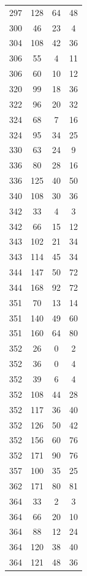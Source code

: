 \documentclass[12pt]{amsproc} %
\theoremstyle{definition}\newtheorem{defn}[thm]{Definition}
\theoremstyle{definition}\newtheorem{rem}[thm]{Remark}
\theoremstyle{definition}\newtheorem{ex}[thm]{Example}
\begin{document}
\begin{table}[ht]
    \centering
    \begin{minipage}{0.25\textwidth}
        \centering
        \begin{tabular}{c|c|c|c}
		297 & 128 & 64 & 48 \\ 
		300 & 46 & 23 & 4 \\ 
		304 & 108 & 42 & 36 \\ 
		306 & 55 & 4 & 11 \\ 
		306 & 60 & 10 & 12 \\ 
		320 & 99 & 18 & 36 \\ 
		322 & 96 & 20 & 32 \\ 
		324 & 68 & 7 & 16 \\ 
		324 & 95 & 34 & 25 \\ 
		330 & 63 & 24 & 9 \\ 
		336 & 80 & 28 & 16 \\ 
		336 & 125 & 40 & 50 \\ 
		340 & 108 & 30 & 36 \\ 
		342 & 33 & 4 & 3 \\ 
		342 & 66 & 15 & 12 \\ 
		343 & 102 & 21 & 34 \\ 
		343 & 114 & 45 & 34 \\ 
		344 & 147 & 50 & 72 \\ 
		344 & 168 & 92 & 72 \\ 
		351 & 70 & 13 & 14 \\ 
		351 & 140 & 49 & 60 \\ 
		351 & 160 & 64 & 80 \\ 
		352 & 26 & 0 & 2 \\ 
		352 & 36 & 0 & 4 \\ 
		352 & 39 & 6 & 4 \\ 
		352 & 108 & 44 & 28 \\ 
		352 & 117 & 36 & 40 \\ 
		352 & 126 & 50 & 42 \\ 
		352 & 156 & 60 & 76 \\ 
		352 & 171 & 90 & 76 \\ 
		357 & 100 & 35 & 25 \\ 
		362 & 171 & 80 & 81 \\ 
		364 & 33 & 2 & 3 \\ 
		364 & 66 & 20 & 10 \\ 
		364 & 88 & 12 & 24 \\ 
		364 & 120 & 38 & 40 \\ 
		364 & 121 & 48 & 36 \\ 

\end{tabular}
\end{minipage}
\end{table}
\end{document}
